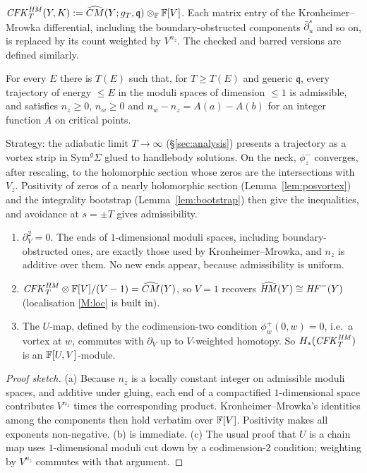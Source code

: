 \begin{definition}\label{def:CFKHM}
$\mathit{CFK}^{\mathit{HM}}_T(Y,K):=\widehat{CM}(Y;g_T,\mathfrak q)\otimes_{\mathbb{F}}\mathbb{F}[V]$.  Each matrix entry of the Kronheimer--Mrowka
differential, including the boundary-obstructed components $\bar\partial^s_u$ and so on, is replaced by its count weighted
by $V^{n_z}$.  The checked and barred versions are defined similarly.
\end{definition}

\begin{conjecture}\label{conj:Mpos}
For every $E$ there is $T(E)$ such that, for $T\ge T(E)$ and generic $\mathfrak q$, every trajectory of energy $\le E$ in the
moduli spaces of dimension $\le1$ is admissible, and satisfies $n_z\ge0$, $n_w\ge0$ and
$n_w-n_z=A(a)-A(b)$ for an integer function $A$ on critical points.
\end{conjecture}
Strategy: the adiabatic limit $T\to\infty$ (\S\ref{sec:analysis}) presents a trajectory as a vortex strip in
$\mathrm{Sym}^g\Sigma$ glued to handlebody solutions.  On the neck, $\phi^-_z$ converges, after rescaling, to the
holomorphic section whose zeros are the intersections with $V_z$.  Positivity of zeros of a nearly holomorphic
section (Lemma~\ref{lem:posvortex}) and the integrality bootstrap (Lemma~\ref{lem:bootstrap}) then give the
inequalities, and avoidance at $s=\pm T$ gives admissibility.

\begin{theorem}\label{thm:Mstructure}
\begin{enumerate}[label=(\alph*)]
\item $\partial_V^2=0$.  The ends of $1$-dimensional moduli spaces, including boundary-obstructed ones, are exactly
those used by Kronheimer--Mrowka, and $n_z$ is additive over them.  No new ends appear, because admissibility is
uniform.
\item $\mathit{CFK}^{\mathit{HM}}_T\otimes\mathbb{F}[V]/(V-1)=\widehat{CM}(Y)$, so $V=1$ recovers $\widehat{\mathit{HM}}(Y)\cong\mathit{HF}^-(Y)$ (localisation \ref{M:loc}
is built in).
\item The $U$-map, defined by the codimension-two condition $\phi^+_w(0,w)=0$, i.e.\ a vortex at $w$, commutes with
$\partial_V$ up to $V$-weighted homotopy.  So $H_*(\mathit{CFK}^{\mathit{HM}}_T)$ is an $\mathbb{F}[U,V]$-module.
\end{enumerate}
\end{theorem}
\begin{proof}[Proof sketch]
(a) Because $n_z$ is a locally constant integer on admissible moduli spaces, and additive under gluing, each end of a
compactified $1$-dimensional space contributes $V^{n_z}$ times the corresponding product.  Kronheimer--Mrowka's
identities among the components then hold verbatim over $\mathbb{F}[V]$.  Positivity makes all exponents non-negative.
(b) is immediate.  (c) The usual proof that $U$ is a chain map uses $1$-dimensional moduli cut down by a codimension-$2$
condition; weighting by $V^{n_z}$ commutes with that argument.
\end{proof}

